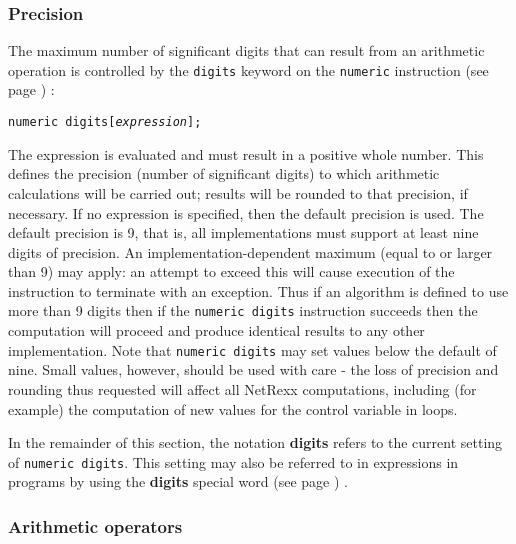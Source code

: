 \subsubsection{Precision}\label{"id"}
 The maximum number of significant digits that can result from an
arithmetic operation is controlled by the \texttt{digits} keyword on the
 \texttt{numeric} instruction (see page \pageref{refnumeric}) :
\begin{alltt}
\texttt{numeric digits} [\emph{expression}];
\end{alltt}
The expression is evaluated and must result in a positive whole
number.
This defines the precision (number of significant digits) to which
arithmetic calculations will be carried out; results will be rounded to
that precision,
if necessary.
 If no expression is specified, then the default precision is used.
The default precision is 9, that is, all implementations must support
at least nine digits of precision.  An implementation-dependent maximum
(equal to or larger than 9) may apply: an attempt to exceed this will
cause execution of the instruction to terminate with an exception.
Thus if an algorithm is defined to use more than 9 digits then if
the \texttt{numeric digits} instruction succeeds then the computation
will proceed and produce identical results to any other implementation.
 Note that \texttt{numeric digits} may set values below the default of
nine.
Small values, however, should be used with care - the loss of
precision and rounding thus requested will affect all NetRexx
computations, including (for example) the computation of new values for
the control variable in loops.
 
In the remainder of this section, the notation \textbf{digits} refers
to the current setting of \texttt{numeric digits}.
This setting may also be referred to in expressions in programs by using
the \textbf{digits}  special word (see page \pageref{refspecial}) .
\subsubsection{Arithmetic operators}
 
